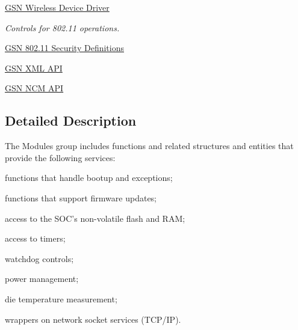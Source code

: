 \begin{DoxyCompactItemize}
\item 
\hyperlink{a00677}{GSN Wireless Device Driver}


\begin{DoxyCompactList}\small\item\em Controls for 802.11 operations. \end{DoxyCompactList}

\item 
\hyperlink{a00678}{GSN 802.11 Security Definitions}
\item 
\hyperlink{a00679}{GSN XML API}
\item 
\hyperlink{a00688}{GSN NCM API}
\end{DoxyCompactItemize}


\subsection{Detailed Description}
The Modules group includes functions and related structures and entities that provide the following services:


\begin{DoxyItemize}
\item functions that handle bootup and exceptions;
\item functions that support firmware updates;
\item access to the SOC's non-\/volatile flash and RAM;
\item access to timers;
\item watchdog controls;
\item power management;
\item die temperature measurement;
\item wrappers on network socket services (TCP/IP). 
\end{DoxyItemize}
